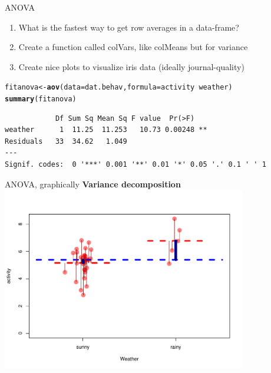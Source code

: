 \documentclass[10pt]{beamer}\usepackage[]{graphicx}\usepackage[]{color}
\makeatletter
\newcommand{\hlopt}[1]{\textcolor[rgb]{0,0,0}{#1}}%
\newcommand{\hlstd}[1]{\textcolor[rgb]{0.345,0.345,0.345}{#1}}%
\newcommand{\hlkwb}[1]{\textcolor[rgb]{0.69,0.353,0.396}{#1}}%
\newcommand{\hlkwc}[1]{\textcolor[rgb]{0.333,0.667,0.333}{#1}}%
\newcommand{\hlkwd}[1]{\textcolor[rgb]{0.737,0.353,0.396}{\textbf{#1}}}%
\newenvironment{kframe}{%
 \def\at@end@of@kframe{}%
 \ifinner\ifhmode%
  \def\at@end@of@kframe{\end{minipage}}%
  \begin{minipage}{\columnwidth}%
 \fi\fi%
 \def\FrameCommand##1{\hskip\@totalleftmargin \hskip-\fboxsep
 \colorbox{shadecolor}{##1}\hskip-\fboxsep
     \hskip-\linewidth \hskip-\@totalleftmargin \hskip\columnwidth}%
 \MakeFramed {\advance\hsize-\width
   \@totalleftmargin\z@ \linewidth\hsize
   \@setminipage}}%
 {\par\unskip\endMakeFramed%
 \at@end@of@kframe}
\newenvironment{knitrout}{}{} %
\makeatother
\begin{document}
\begin{frame}[fragile]{ANOVA}  \begin{enumerate}
    \item What is the fastest way to get row averages in a data-frame?
    \item Create a function called colVars, like colMeans but for variance
    \item Create nice plots to visualize iris data (ideally journal-quality)
  \end{enumerate}


\begin{knitrout}
\color{fgcolor}\begin{kframe}
\begin{alltt}
\hlstd{fitanova} \hlkwb{<-} \hlkwd{aov}\hlstd{(}\hlkwc{data} \hlstd{= dat.behav,} \hlkwc{formula} \hlstd{= activity} \hlopt{~} \hlstd{weather)}
\hlkwd{summary}\hlstd{(fitanova)}
\end{alltt}
\begin{verbatim}
            Df Sum Sq Mean Sq F value  Pr(>F)   
weather      1  11.25  11.253   10.73 0.00248 **
Residuals   33  34.62   1.049                   
---
Signif. codes:  0 '***' 0.001 '**' 0.01 '*' 0.05 '.' 0.1 ' ' 1
\end{verbatim}
\end{kframe}
\end{knitrout}
\end{frame}

\begin{frame}[fragile]{ANOVA, graphically}
\textbf{Variance decomposition}
\centering
\begin{knitrout}
\color{fgcolor}
\includegraphics[width=0.8\textwidth,height=0.6\textwidth]{figure/unnamed-chunk-17-1} 

\end{knitrout}
\end{frame}
\end{document}

